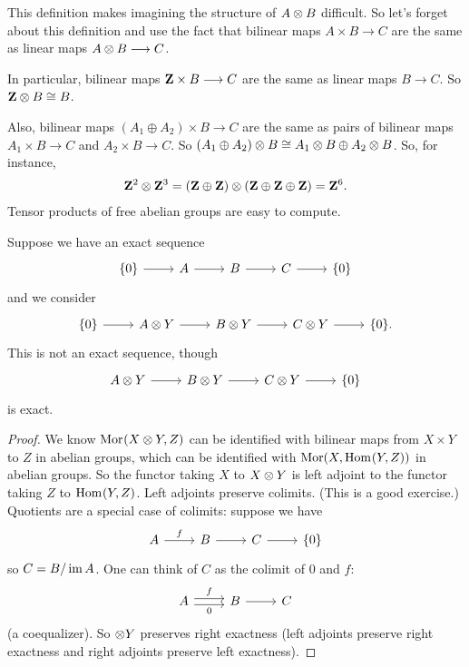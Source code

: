 \documentclass[11pt, oneside,margin=1in]{article}
\begin{document}
This definition makes imagining the structure of $A\otimes B$ difficult. So let's forget about this definition and use the fact that bilinear maps $A\times B\longrightarrow C$ are the same as linear maps $A\otimes B\longrightarrow C$. 

In particular, bilinear maps $\mathbf Z \times B\longrightarrow C$ are the same as linear maps $B\longrightarrow C$. So $\mathbf Z\otimes B\cong B$. %

Also, bilinear maps $(A_1\oplus A_2) \times B\longrightarrow C$ are the same as pairs of bilinear maps $A_1\times B\longrightarrow C$ and $A_2\times B\longrightarrow C$. So $(A_1\oplus A_2) \otimes B \cong A_1 \otimes B \oplus A_2 \otimes B$. So, for instance, \begin{align*}
	\mathbf Z^2 \otimes \mathbf Z^3 = (\mathbf{Z}\oplus\mathbf{Z})\otimes(\mathbf{Z}\oplus\mathbf{Z}\oplus \mathbf{Z})=\mathbf Z^6.
\end{align*}
Tensor products of free abelian groups are easy to compute. 

Suppose we have an exact sequence
\[
\begin{tikzcd}
	\{0\}\arrow[r]&A\arrow[r]&B\arrow[r]&C\arrow[r]	&\{0\}
\end{tikzcd}
\]
and we consider
\[
\begin{tikzcd}
        \{0\}\arrow[r]&A\tensor Y\arrow[r]&B\tensor Y\arrow[r]&C\tensor Y\arrow[r] &\{0\}.
\end{tikzcd}
\]
This is not an exact sequence, though
\[
\begin{tikzcd}
        A\tensor Y\arrow[r]&B\tensor Y\arrow[r]&C\tensor Y\arrow[r] &\{0\}
\end{tikzcd}
\]
is exact.

\begin{proof}
We know $\operatorname{Mor}_{}(X\otimes Y, Z)$ can be identified with bilinear maps from $X\times Y$ to $Z$ in abelian groups, which can be identified with $\operatorname{Mor}(X, \operatorname{Hom}_{}(Y, Z))$ in abelian groups. So the functor taking $X$ to $X\otimes Y$ is left adjoint to the functor taking $Z$ to $\operatorname{Hom}_{}(Y, Z)$. Left adjoints preserve colimits. (This is a good exercise.) Quotients are a special case of colimits: suppose we have
\[
\begin{tikzcd}
	A \arrow[r, "f"] & B \arrow[r]& C \arrow[r]&\{0\}
\end{tikzcd}
\]
so $C=B/\operatorname{im} A$. One can think of $C$ as the colimit of $0$ and $f$:
 \[
\begin{tikzcd}
A \arrow[r, "f", shift left]\arrow[r, "0", shift right, swap] & B \arrow[r]& C
\end{tikzcd}
\]
(a coequalizer). So $\otimes Y$ preserves right exactness (left adjoints preserve right exactness and right adjoints preserve left exactness).
\end{proof}
\end{document}
